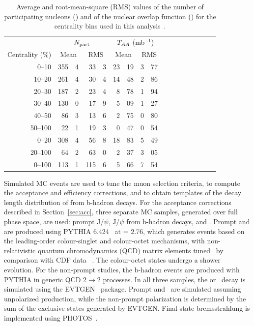 \begin{table}[htbp]
  \begin{center}
    \caption{Average and root-mean-square (RMS) values of the number of
      participating nucleons (\npart) and of the nuclear overlap function
      (\taa) for the centrality bins used in this
      analysis~\cite{Chatrchyan:2011sx}.}
    \label{tab:glauber}
    \begin{tabular}{rr@{.}lr@{.}lr@{.}lr@{.}lr@{.}lr@{.}lr@{.}lr@{.}l}
      \hline\vspace{0.1em}
      ~ & \multicolumn{4}{c}{$N_{\text{part}}$} &
      \multicolumn{4}{c}{$T_{AA}$ (mb$^{-1}$)}\\
      Centrality (\%) & \multicolumn{2}{c}{Mean} & \multicolumn{2}{c}{RMS} & \multicolumn{2}{c}{Mean} & \multicolumn{2}{c}{RMS} \\\hline
      0--10	& 355&4 & 33&3 & 23&19 & 3&77 \\
      10--20	& 261&4 & 30&4 & 14&48 & 2&86 \\
      20--30	& 187&2 & 23&4 & 8&78  & 1&94 \\
      30--40	& 130&0 & 17&9 & 5&09  & 1&27 \\
      40--50	& 86&3  & 13&6 & 2&75  & 0&80 \\
      50--100	& 22&1  & 19&3 & 0&47  & 0&54 \\\hline
      0--20	& 308&4 & 56&8 & 18&83 & 5&49 \\
      20--100	& 64&2  & 63&0 & 2&37  & 3&05 \\\hline
      0--100	& 113&1 &115&6 & 5&66  & 7&54 \\\hline
    \end{tabular}
  \end{center}
\end{table}

\PgUa
Simulated MC events are used to tune the muon selection criteria, to
compute the acceptance and efficiency corrections, and to obtain
templates of the decay length distribution of \Jpsi from b-hadron
decays.  For the acceptance corrections described in
Section~\ref{sec:acc}, three separate MC samples, generated over full
phase space, are used: prompt J/$\psi$, J/$\psi$ from b-hadron decays,
and \PgUa. Prompt \Jpsi and \PgUa  are produced using PYTHIA
6.424~\cite{Sjostrand:2006za} at \sqrts = 2.76\TeV, which generates
events based on the leading-order colour-singlet and colour-octet
mechanisms, with non-relativistic quantum chromodynamics (QCD) matrix
elements tuned~\cite{Bargiotti:2007zz} by comparison with CDF data
~\cite{Acosta:2004yw}. The colour-octet states undergo a shower
evolution. For the non-prompt \Jpsi studies, the b-hadron events
are produced with PYTHIA in generic QCD 2$\rightarrow$2 processes. In
all three samples, the \Jpsi or \PgUa\ decay is simulated using the
EVTGEN~\cite{Lange:2001uf} package. Prompt \Jpsi and \PgUa\ are
simulated assuming unpolarized production, while the non-prompt \Jpsi
polarization is determined by the sum of the exclusive states
generated by EVTGEN. Final-state bremsstrahlung is implemented using
PHOTOS~\cite{Barberio:1993qi}.

